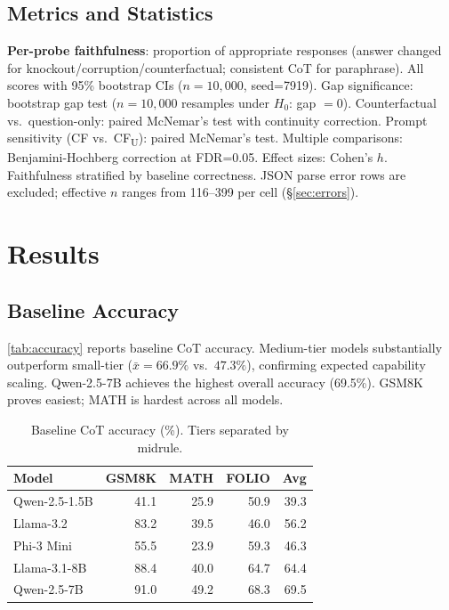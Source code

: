 \documentclass[11pt]{article}
\begin{document}
\subsection{Metrics and Statistics}

\textbf{Per-probe faithfulness}: proportion of appropriate responses (answer changed for knockout/corruption/counterfactual; consistent CoT for paraphrase). All scores with 95\% bootstrap CIs ($n{=}10{,}000$, seed=7919). Gap significance: bootstrap gap test ($n{=}10{,}000$ resamples under $H_0$: gap $= 0$). Counterfactual vs.\ question-only: paired McNemar's test with continuity correction. Prompt sensitivity (CF vs.\ CF\textsubscript{U}): paired McNemar's test. Multiple comparisons: Benjamini-Hochberg correction at FDR=0.05. Effect sizes: Cohen's $h$. Faithfulness stratified by baseline correctness. JSON parse error rows are excluded; effective $n$ ranges from 116--399 per cell (\S\ref{sec:errors}).

\section{Results}
\label{sec:results}

\subsection{Baseline Accuracy}

\autoref{tab:accuracy} reports baseline CoT accuracy. Medium-tier models substantially outperform small-tier ($\bar{x}{=}66.9\%$ vs.\ $47.3\%$), confirming expected capability scaling. Qwen-2.5-7B achieves the highest overall accuracy (69.5\%). GSM8K proves easiest; MATH is hardest across all models.

\begin{table}[t]
\centering\small
\begin{tabular}{lrrr|r}
\toprule
\textbf{Model} & \textbf{GSM8K} & \textbf{MATH} & \textbf{FOLIO} & \textbf{Avg} \\
\midrule
Qwen-2.5-1.5B & 41.1 & 25.9 & 50.9 & 39.3 \\
Llama-3.2 & 83.2 & 39.5 & 46.0 & 56.2 \\
Phi-3 Mini & 55.5 & 23.9 & 59.3 & 46.3 \\
\midrule
Llama-3.1-8B & 88.4 & 40.0 & 64.7 & 64.4 \\
Qwen-2.5-7B & 91.0 & 49.2 & 68.3 & 69.5 \\
\bottomrule
\end{tabular}
\caption{Baseline CoT accuracy (\%). Tiers separated by midrule.}
\label{tab:accuracy}
\end{table}
\end{document}
